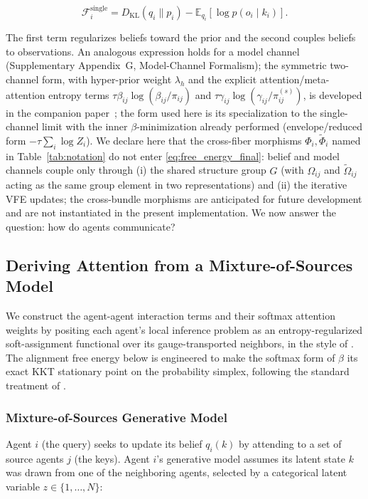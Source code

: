 \documentclass[twoside,11pt]{article}
\begin{document}
\begin{equation}
\mathcal{F}_i^{\text{single}} = D_{\mathrm{KL}}(q_i \| p_i) - \mathbb{E}_{q_i}[\log p(o_i \mid k_i)].
\label{eq:single_agent_fep}
\end{equation}

The first term regularizes beliefs toward the prior and the second couples beliefs to observations. An analogous expression holds for a model channel (Supplementary Appendix~G, Model-Channel Formalism); the symmetric two-channel form, with hyper-prior weight $\lambda_h$ and the explicit attention/meta-attention entropy terms $\tau\beta_{ij}\log(\beta_{ij}/\pi_{ij})$ and $\tau\gamma_{ij}\log(\gamma_{ij}/\pi^{(s)}_{ij})$, is developed in the companion paper~\citep{Dennis2025it}; the form used here is its specialization to the single-channel limit with the inner $\beta$-minimization already performed (envelope/reduced form $-\tau\sum_i \log Z_i$). We declare here that the cross-fiber morphisms $\Phi_i, \tilde{\Phi}_i$ named in Table~\ref{tab:notation} do not enter \eqref{eq:free_energy_final}: belief and model channels couple only through (i) the shared structure group $G$ (with $\Omega_{ij}$ and $\tilde{\Omega}_{ij}$ acting as the same group element in two representations) and (ii) the iterative VFE updates; the cross-bundle morphisms are anticipated for future development and are not instantiated in the present implementation. We now answer the question: how do agents communicate?

\subsection{Deriving Attention from a Mixture-of-Sources Model}
\label{sec:mixture_derivation}

We construct the agent-agent interaction terms and their softmax attention weights by positing each agent's local inference problem as an entropy-regularized soft-assignment functional over its gauge-transported neighbors, in the style of \citet{Cuturi2013}. The alignment free energy below is engineered to make the softmax form of $\beta$ its exact KKT stationary point on the probability simplex, following the standard treatment of \citet{Boyd2004}.

\subsubsection{Mixture-of-Sources Generative Model}

Agent $i$ (the query) seeks to update its belief $q_i(k)$ by attending to a set of source agents $j$ (the keys). Agent $i$'s generative model assumes its latent state $k$ was drawn from one of the neighboring agents, selected by a categorical latent variable $z \in \{1, \ldots, N\}$:
\end{document}
